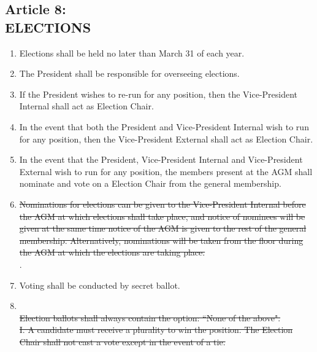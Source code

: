 \documentclass[]{report}
\begin{document}
\clearpage
\begin{center}
	\section*{Article 8:\\ELECTIONS}
	\vspace{12px}
\end{center}
\label{elections}
	\renewcommand{\theenumi}{\Alph{enumi}}
	\begin{enumerate}
	
		\item Elections shall be held no later than March 31 of each year.
		\item The President shall be responsible for overseeing elections.
		\item If the President wishes to re-run for any position, then the Vice-President Internal shall act as Election Chair. 
		\item In the event that both the President and Vice-President Internal wish to run for any position, then the Vice-President External shall act as Election Chair. 
		\item In the event that the President, Vice-President Internal and Vice-President External wish to run for any position, the members present at the AGM shall nominate and vote on a Election Chair from the general membership.
		\item \st{Nominations for elections can be given to the Vice-President Internal before the AGM at which elections shall take place, and notice of nominees will be given at the same time notice of the AGM is given to the rest of the general membership. Alternatively, nominations will be taken from the floor during the AGM at which the elections are taking place.}\\
		\color{red}{Nominations for elections can be given to the Election Chair two weeks prior to the date of the elections}.\color{black}
		\item Voting shall be conducted by secret ballot.
		\item \color{red}{Election ballots shall always have an option to spoil the ballot.}\color{black}\\
		\st{Election ballots shall always contain the option: ``None of the above".}\\
		\st{I. A candidate must receive a plurality to win the position. The Election Chair shall not cast a vote except in the event of a tie.}\\

\end{enumerate}
\end{document}

